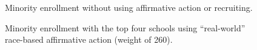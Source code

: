 \begin{figure}
  \centering
  \hfill%
  \caption{Minority enrollment without using affirmative action or recruiting.}
  \label{fig:c1}
\end{figure}

\begin{figure}
  \centering
  \hfill%
  \caption{Minority enrollment with the top four schools using ``real-world'' race-based affirmative action (weight of 260).}
  \label{fig:c2}
\end{figure}

